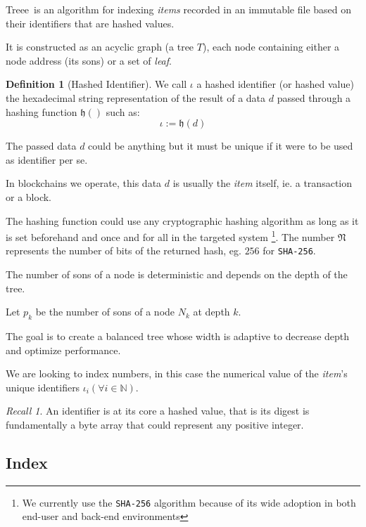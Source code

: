 \documentclass[twoside,twocolumn]{article}
\theoremstyle{definition}
\newtheorem{definition}{Definition}
\theoremstyle{remark}
\newtheorem*{recall}{Recall}
\begin{document}
Treee\texttrademark~is an algorithm for indexing \emph{items} recorded in an immutable file based on their identifiers that are hashed values.

It is constructed as an acyclic graph (a tree $T$), each node containing either a node address (its sons) or a set of \emph{leaf}.

\begin{definition}[Hashed Identifier]
    \label{hashedIdentifier}
    We call $\iota$ a hashed identifier (or hashed value) the hexadecimal string representation of the result of a data $d$ passed through a hashing 
    function $\mathfrak{h}()$ such as:
    \begin{equation}
        \label{eq:hashedIdentifier}
        \iota := \mathfrak{h}(d)
    \end{equation}

    The passed data $d$ could be anything but it must be unique if it were to be used as identifier per se.
    
    In blockchains we operate, this data $d$ is usually the \emph{item} itself, ie. a transaction or a block.

    The hashing function could use any cryptographic hashing algorithm as long as it is set beforehand and once and for all in the targeted system
    \footnote{We currently use the \texttt{SHA-256} algorithm because of its wide adoption in both end-user and back-end environments}.
    The number $\mathfrak{N}$ represents the number of bits of the returned hash, eg. $256$ for \texttt{SHA-256}.
\end{definition}

The number of sons of a node is deterministic and depends on the depth of the tree.

Let $p_k$ be the number of sons of a node $N_k$ at depth $k$.

The goal is to create a balanced tree whose width is adaptive to decrease depth and optimize performance.

We are looking to index numbers, in this case the numerical value of the \emph{item}'s unique identifiers $\iota_i (\forall i \in \mathbb{N})$.

\begin{recall}
    An identifier is at its core a hashed value, that is its digest is fundamentally a byte array that could represent any positive integer.
\end{recall}

\subsection{Index}
\end{document}
